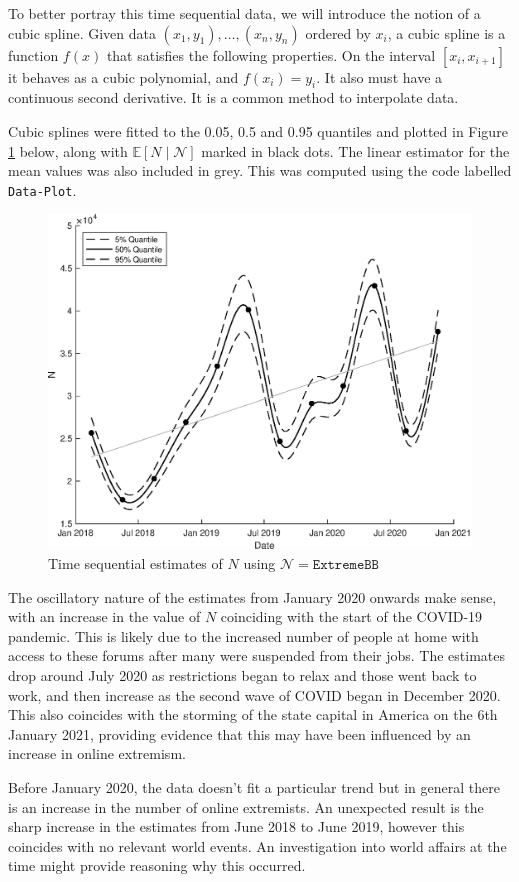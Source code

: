 \documentclass[10pt,a4paper,notitlepage]{article}
\newcommand{\E}{\mathbb{E}}
\begin{document}
To better portray this time sequential data, we will introduce the notion of a cubic spline. Given data $(x_{1},y_{1}),\hdots,(x_{n},y_{n})$ ordered by $x_{i}$, a cubic spline is a function $f(x)$ that satisfies the following properties. On the interval $[x_{i},x_{i+1}]$ it behaves as a cubic polynomial, and $f(x_{i})=y_{i}$. It also must have a continuous second derivative. It is a common method to interpolate data.

Cubic splines were fitted to the 0.05, 0.5 and 0.95 quantiles and plotted in Figure \ref{fg:1} below, along with $\E[N\mid\mathcal{N}]$ marked in black dots. The linear estimator for the mean values was also included in grey. This was computed using the code labelled \texttt{Data-Plot}.
\begin{figure}[H]
\centering
\includegraphics[width=12cm]{Results}
\caption{Time sequential estimates of $N$ using $\mathcal{N} = \texttt{ExtremeBB}$}\label{fg:1}
\end{figure}
The oscillatory nature of the estimates from January 2020 onwards make sense, with an increase in the value of $N$ coinciding with the start of the COVID-19 pandemic. This is likely due to the increased number of people at home with access to these forums after many were suspended from their jobs. The estimates drop around July 2020 as restrictions began to relax and those went back to work, and then increase as the second wave of COVID began in December 2020. This also coincides with the storming of the state capital in America on the 6th January 2021, providing evidence that this may have been influenced by an increase in online extremism.

Before January 2020, the data doesn't fit a particular trend but in general there is an increase in the number of online extremists. An unexpected result is the sharp increase in the estimates from June 2018 to June 2019, however this coincides with no relevant world events. An investigation into world affairs at the time might provide reasoning why this occurred.
\end{document}
